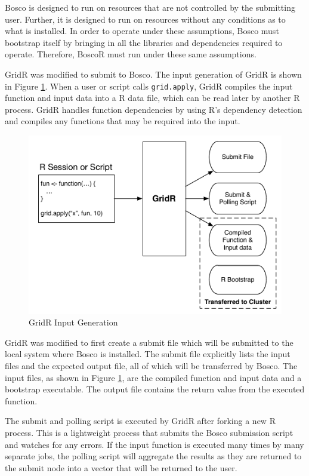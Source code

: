 Bosco is designed to run on resources that are not controlled by the submitting user.  Further, it is designed to run on resources without any conditions as to what is installed.  In order to operate under these assumptions, Bosco must bootstrap itself by bringing in all the libraries and dependencies required to operate.  Therefore, BoscoR must run under these same assumptions.

GridR was modified to submit to Bosco.  The input generation of GridR is shown in Figure \ref{fig:gridrinput}.  When a user or script calls \texttt{grid.apply}, GridR compiles the input function and input data into a R data file, which can be read later by another R process.  GridR handles function dependencies by using R's dependency detection and compiles any functions that may be required into the input.  

\begin{figure}[h!t]
\centering
\includegraphics[width=\textwidth]{BoscoRImages/InputDiagram.pdf}
\caption{GridR Input Generation}
\label{fig:gridrinput}
\end{figure}

GridR was modified to first create a submit file which will be submitted to the local system where Bosco is installed.  The submit file explicitly lists the input files and the expected output file, all of which will be transferred by Bosco.  The input files, as shown in Figure \ref{fig:gridrinput}, are the compiled function and input data and a bootstrap executable.  The output file contains the return value from the executed function.

The submit and polling script is executed by GridR after forking a new R process.  This is a lightweight process that submits the Bosco submission script and watches for any errors.  If the input function is executed many times by many separate jobs, the polling script will aggregate the results as they are returned to the submit node into a vector that will be returned to the user.  

